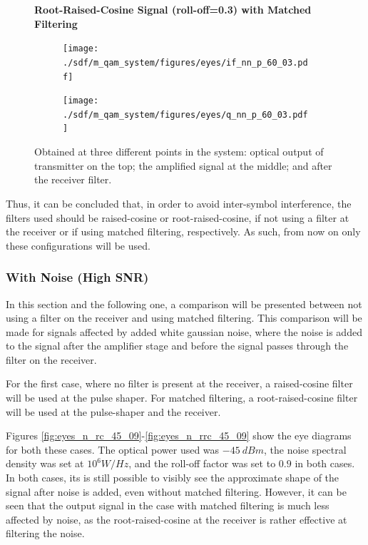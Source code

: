 \begin{figure}[H]
		\centering
	\textbf{Root-Raised-Cosine Signal (roll-off=0.3) with Matched Filtering}
	\begin{minipage}{\linewidth}
		\centering
	\begin{subfigure}{.45\textwidth}
		\centering
		\texttt{[image: ./sdf/m\_qam\_system/figures/eyes/if\_nn\_p\_60\_03.pdf]}
	\end{subfigure}
	\begin{subfigure}{.45\textwidth}
		\centering
		\texttt{[image: ./sdf/m\_qam\_system/figures/eyes/q\_nn\_p\_60\_03.pdf]}
	\end{subfigure}
	
	\caption{
		Obtained at
		three different points in the system: optical output of transmitter on the top;
		the amplified signal at the middle; and
		after the receiver filter.
		\label{fig:eyes_nn_rrc_03}}
	\end{minipage}
	
\end{figure}

Thus, it can be concluded that, in order to avoid inter-symbol interference,
the filters used should be raised-cosine or root-raised-cosine, if not using a
filter at the receiver or if using matched filtering, respectively. As such,
from now on only these configurations will be used.

\subsubsection*{With Noise (High SNR)}

In this section and the following one, a comparison will be presented between
not using a filter on the receiver and using matched filtering. This comparison
will be made for signals affected by added white gaussian noise, where the
noise is added to the signal after the amplifier stage and before the signal
passes through the filter on the receiver.

For the first case, where no filter is present at the receiver, a
raised-cosine filter will be used at the pulse shaper. For matched filtering, a
root-raised-cosine filter will be used at the pulse-shaper and the receiver.

Figures \ref{fig:eyes_n_rc_45_09}-\ref{fig:eyes_n_rrc_45_09} show the eye
diagrams for both these cases. The optical power used was $-45~dBm$, the
noise spectral density was set at $10^6 W/Hz$, and the roll-off factor was set
to $0.9$ in both cases. In both cases, its is still possible to visibly see the
approximate shape of the signal after noise is added, even without matched
filtering. However, it can be seen that the output signal in the case with
matched filtering is much less affected by noise, as the root-raised-cosine at
the receiver is rather effective at filtering the noise.

